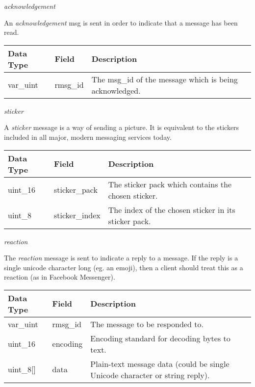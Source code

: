 \documentclass{article}
\begin{document}
\begin{center}
    \large \textit{acknowledgement}
\end{center}
An \textit{acknowledgement} msg is sent in order to indicate that a message has been read.
\begin{table}[H]
\centering
\begin{tabular}{|p{1.3cm}|p{2.5cm}|p{6cm}|}
\hline
\rowcolor{tblgrey} 
Data Type       & Field           & Description                                               \\ \hline
var\_uint       & rmsg\_id         & The msg\_id of the message which is being acknowledged.   \\ \hline
\end{tabular}
\end{table}

\begin{center}
    \large \textit{sticker}
\end{center}
A \textit{sticker} message is a way of sending a picture. It is equivalent to the stickers included in all major, modern messaging services today.
\begin{table}[H]
\centering
\begin{tabular}{|p{1.3cm}|p{2.5cm}|p{6cm}|}
\hline
\rowcolor{tblgrey} 
Data Type       & Field           & Description                                               \\ \hline
uint\_16        & sticker\_pack   & The sticker pack which contains the chosen sticker.       \\ \hline
uint\_8         & sticker\_index  & The index of the chosen sticker in its sticker pack.      \\ \hline
\end{tabular}
\end{table}

\begin{center}
    \large \textit{reaction}
\end{center}
The \textit{reaction} message is sent to indicate a reply to a message. If the reply is a single unicode character long (eg. an emoji), then a client should treat this as a reaction (as in Facebook Messenger).
\begin{table}[H]
\centering
\begin{tabular}{|p{1.3cm}|p{2.5cm}|p{6cm}|}
\hline
\rowcolor{tblgrey} 
Data Type       & Field           & Description                                               \\ \hline
var\_uint       & rmsg\_id         & The message to be responded to.                           \\ \hline
uint\_16        & encoding        & Encoding standard for decoding bytes to text.      \\ \hline
uint\_8[\hspace{0.05cm}] & data            & Plain-text message data (could be single Unicode character or string reply).      \\ \hline
\end{tabular}
\end{table}
\end{document}
